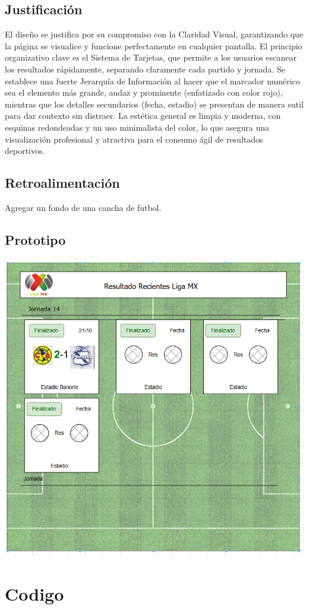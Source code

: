 \documentclass[11pt]{scrartcl}
\begin{document}
\subsection{Justificación}
El diseño se justifica por su compromiso con la Claridad Visual, garantizando que la página se visualice y funcione perfectamente en cualquier pantalla. El principio organizativo clave es el Sistema de Tarjetas, que permite a los usuarios escanear los resultados rápidamente, separando claramente cada partido y jornada. Se establece una fuerte Jerarquía de Información al hacer que el marcador numérico sea el elemento más grande, audaz y prominente (enfatizado con color rojo), mientras que los detalles secundarios (fecha, estadio) se presentan de manera sutil para dar contexto sin distraer. La estética general es limpia y moderna, con esquinas redondeadas y un uso minimalista del color, lo que asegura una visualización profesional y atractiva para el consumo ágil de resultados deportivos.


\subsection{Retroalimentación}
Agregar un fondo de una cancha de futbol.

\subsection{Prototipo}
\begin{center}
    \includegraphics[scale=0.7]{prototipo.png}
\end{center}

\section{Codigo}



    
\end{document}
